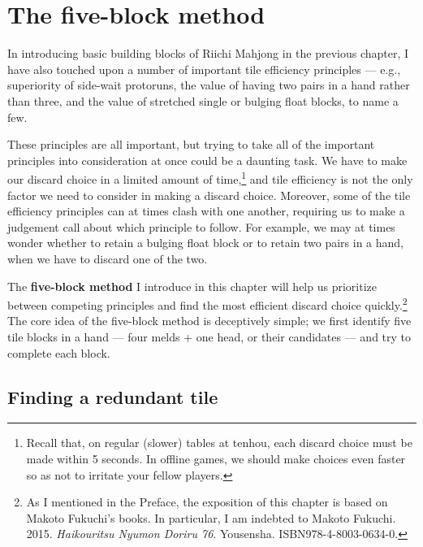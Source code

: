 
\chapter{The five-block method} \label{ch:five}

In introducing basic building blocks of Riichi Mahjong in the previous chapter, I have also touched upon a number of important tile efficiency principles ---
e.g., superiority of side-wait protoruns, the value of having two pairs in a hand rather than three, and the value of stretched single or bulging float blocks, to name a few. 

\bigskip
These principles are all important, but trying to take all of the important principles into consideration at once could be a daunting task. We have to make our discard choice in a limited amount of time,\footnote{Recall that, on regular (slower) tables at {\jap tenhou}, each discard choice must be made within 5 seconds. In offline games, we should make choices even faster so as not to irritate your fellow players.} and tile efficiency is not the only factor we need to consider in making a discard choice. 
Moreover, some of the tile efficiency principles can at times clash with one another, requiring us to make a judgement call about which principle to follow. For example, we may at times wonder whether to retain a bulging float block or to retain two pairs in a hand, when we have to discard one of the two. 

\bigskip
The {\bf five-block method} I introduce in this chapter will help us prioritize between competing principles and find the most efficient discard choice quickly.\footnote{As I mentioned in the Preface, the exposition of this chapter is based on Makoto Fukuchi's books. In particular, I am indebted to Makoto Fukuchi. 2015. \textit{Haikouritsu Nyumon Doriru 76}. Yousensha. ISBN978-4-8003-0634-0.}
The core idea of the five-block method is deceptively simple; we first identify five tile blocks in a hand --- four melds + one head, or their candidates --- and try to complete each block. 

\section{Finding a redundant tile} 

